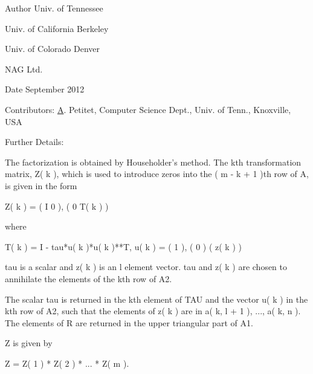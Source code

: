\begin{DoxyAuthor}{Author}
Univ. of Tennessee 

Univ. of California Berkeley 

Univ. of Colorado Denver 

N\+A\+G Ltd. 
\end{DoxyAuthor}
\begin{DoxyDate}{Date}
September 2012 
\end{DoxyDate}
\begin{DoxyParagraph}{Contributors\+: }
\hyperlink{classA}{A}. Petitet, Computer Science Dept., Univ. of Tenn., Knoxville, U\+S\+A 
\end{DoxyParagraph}
\begin{DoxyParagraph}{Further Details\+: }
\begin{DoxyVerb}  The factorization is obtained by Householder's method.  The kth
  transformation matrix, Z( k ), which is used to introduce zeros into
  the ( m - k + 1 )th row of A, is given in the form

     Z( k ) = ( I     0   ),
              ( 0  T( k ) )

  where

     T( k ) = I - tau*u( k )*u( k )**T,   u( k ) = (   1    ),
                                                 (   0    )
                                                 ( z( k ) )

  tau is a scalar and z( k ) is an l element vector. tau and z( k )
  are chosen to annihilate the elements of the kth row of A2.

  The scalar tau is returned in the kth element of TAU and the vector
  u( k ) in the kth row of A2, such that the elements of z( k ) are
  in  a( k, l + 1 ), ..., a( k, n ). The elements of R are returned in
  the upper triangular part of A1.

  Z is given by

     Z =  Z( 1 ) * Z( 2 ) * ... * Z( m ).\end{DoxyVerb}
 
\end{DoxyParagraph}
